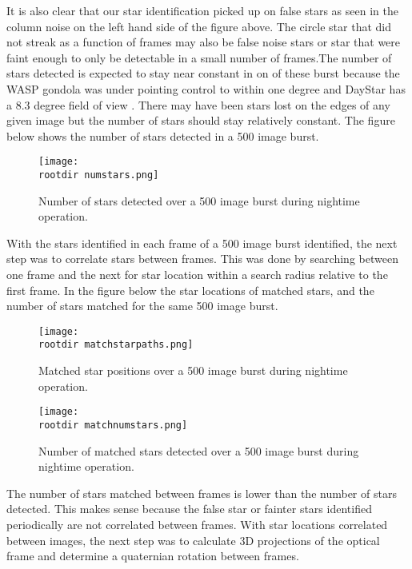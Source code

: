 \documentclass[twocolumn,letterpaper]{IEEEAerospace2012}
\newcommand{\rootdir}{./Figures/}
\begin{document}
It is also clear that our star identification picked up on false stars as seen in the column noise on the left hand side of the figure above. The circle star that did not streak as a function of frames may also be false noise stars or star that were faint enough to only be detectable in a small number of frames.The number of stars detected is expected to stay near constant in on of these burst because the WASP gondola was under pointing control to within one degree and DayStar has a 8.3 degree field of view . There may have been stars lost on the edges of any given image but the number of stars should stay relatively constant. The figure below shows the number of stars detected in a 500 image burst.
  
\begin{figure}
    \centering
    \texttt{[image: \\rootdir numstars.png]}
    \caption{Number of stars detected over a 500 image burst during nightime operation.}
    \label{fig:numstars}
\end{figure}

With the stars identified in each frame of a 500 image burst identified, the next step was to correlate stars between frames. This was done by searching between one frame and the next for star location within a search radius relative to the first frame. In the figure below the star locations of matched stars, and the number of stars matched for the same 500 image burst.  

\begin{figure}
    \centering
    \texttt{[image: \\rootdir matchstarpaths.png]}
    \caption{Matched star positions over a 500 image burst during nightime operation.}
    \label{fig:matchstarpaths}
\end{figure}

\begin{figure}
    \centering
    \texttt{[image: \\rootdir matchnumstars.png]}
    \caption{Number of matched stars detected over a 500 image burst during nightime operation.}
    \label{fig:matchnumstars}
\end{figure}

The number of stars matched between frames is lower than the number of stars detected. This makes sense because the false star or fainter stars identified periodically are not correlated between frames. With star locations correlated between images, the next step was to calculate 3D projections of the optical frame and determine a quaternian rotation between frames.   
\end{document}
